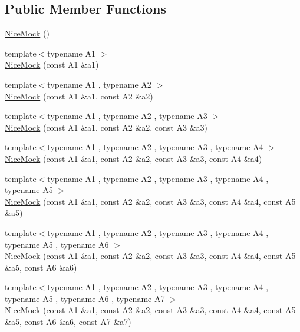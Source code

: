 \subsection*{Public Member Functions}
\begin{DoxyCompactItemize}
\item 
\hyperlink{classtesting_1_1NiceMock_a10bbd6ebe779ac8ab1f9f3ae2dee9310}{Nice\+Mock} ()
\item 
{\footnotesize template$<$typename A1 $>$ }\\\hyperlink{classtesting_1_1NiceMock_a2d6b9cb9d929d1af4532b69c7ef19df6}{Nice\+Mock} (const A1 \&a1)
\item 
{\footnotesize template$<$typename A1 , typename A2 $>$ }\\\hyperlink{classtesting_1_1NiceMock_a150837476e88f52772c8f85180b889a1}{Nice\+Mock} (const A1 \&a1, const A2 \&a2)
\item 
{\footnotesize template$<$typename A1 , typename A2 , typename A3 $>$ }\\\hyperlink{classtesting_1_1NiceMock_a0b91bd74b497626bb81d07c3d4b59d22}{Nice\+Mock} (const A1 \&a1, const A2 \&a2, const A3 \&a3)
\item 
{\footnotesize template$<$typename A1 , typename A2 , typename A3 , typename A4 $>$ }\\\hyperlink{classtesting_1_1NiceMock_a5ffbe1a648f16612266d4e67a2d063d1}{Nice\+Mock} (const A1 \&a1, const A2 \&a2, const A3 \&a3, const A4 \&a4)
\item 
{\footnotesize template$<$typename A1 , typename A2 , typename A3 , typename A4 , typename A5 $>$ }\\\hyperlink{classtesting_1_1NiceMock_a3812c0ba0d743f9a0c3d276dfc076f4c}{Nice\+Mock} (const A1 \&a1, const A2 \&a2, const A3 \&a3, const A4 \&a4, const A5 \&a5)
\item 
{\footnotesize template$<$typename A1 , typename A2 , typename A3 , typename A4 , typename A5 , typename A6 $>$ }\\\hyperlink{classtesting_1_1NiceMock_a156d0fce85ac08abffdf4aa0c3975f81}{Nice\+Mock} (const A1 \&a1, const A2 \&a2, const A3 \&a3, const A4 \&a4, const A5 \&a5, const A6 \&a6)
\item 
{\footnotesize template$<$typename A1 , typename A2 , typename A3 , typename A4 , typename A5 , typename A6 , typename A7 $>$ }\\\hyperlink{classtesting_1_1NiceMock_a946d75ece1fa3a066b7d9d6ab7828c55}{Nice\+Mock} (const A1 \&a1, const A2 \&a2, const A3 \&a3, const A4 \&a4, const A5 \&a5, const A6 \&a6, const A7 \&a7)

\end{DoxyCompactItemize}
